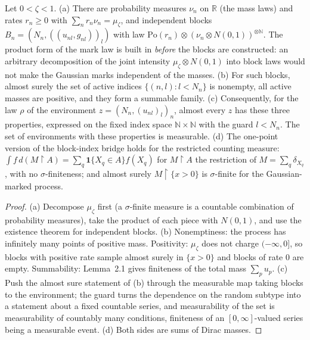 \begin{lemma}\label{lem:sg:pd-split-env}
  \leanok
  Let $0<\zeta<1$. (a) There are probability measures $\nu_n$ on $\mathbb R$ (the mass laws) and rates $r_n\ge0$ with $\sum_nr_n\nu_n=\mu_\zeta$, and independent blocks $B_n=(N_n,((u_{nl},g_{nl}))_l)$ with law $\mathrm{Po}(r_n)\otimes(\nu_n\otimes N(0,1))^{\otimes\mathbb N}$. The product form of the mark law is built in \emph{before} the blocks are constructed: an arbitrary decomposition of the joint intensity $\mu_\zeta\otimes N(0,1)$ into block laws would not make the Gaussian marks independent of the masses. (b) For such blocks, almost surely the set of active indices $\{(n,l):l<N_n\}$ is nonempty, all active masses are positive, and they form a summable family. (c) Consequently, for the law $\rho$ of the environment $z=(N_n,(u_{nl})_l)_n$, almost every $z$ has these three properties, expressed on the fixed index space $\mathbb N\times\mathbb N$ with the guard $l<N_n$. The set of environments with these properties is measurable. (d) The one-point version of the block-index bridge holds for the restricted counting measure: $\int f\,d(M\!\restriction\!A)=\sum_q\mathbf 1\{X_q\in A\}f(X_q)$ for $M\!\restriction\!A$ the restriction of $M=\sum_q\delta_{X_q}$, with no $\sigma$-finiteness; and almost surely $M\!\restriction\!\{x>0\}$ is $\sigma$-finite for the Gaussian-marked process.
\end{lemma}

\begin{proof}
  \leanok
(a) Decompose $\mu_\zeta$ first (a $\sigma$-finite measure is a countable combination of probability measures), take the product of each piece with $N(0,1)$, and use the existence theorem for independent blocks. (b) Nonemptiness: the process has infinitely many points of positive mass. Positivity: $\mu_\zeta$ does not charge $(-\infty,0]$, so blocks with positive rate sample almost surely in $\{x>0\}$ and blocks of rate $0$ are empty. Summability: Lemma~2.1 gives finiteness of the total mass $\sum_{p}u_p$. (c) Push the almost sure statement of (b) through the measurable map taking blocks to the environment; the guard turns the dependence on the random subtype into a statement about a fixed countable series, and measurability of the set is measurability of countably many conditions, finiteness of an $[0,\infty]$-valued series being a measurable event. (d) Both sides are sums of Dirac masses.
\end{proof}


